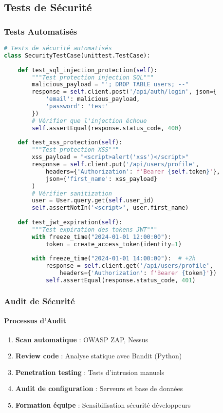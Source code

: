 \subsection{Tests de Sécurité}

\subsubsection{Tests Automatisés}

\begin{lstlisting}[language=python]
# Tests de sécurité automatisés
class SecurityTestCase(unittest.TestCase):
    
    def test_sql_injection_protection(self):
        """Test protection injection SQL"""
        malicious_payload = "'; DROP TABLE users; --"
        response = self.client.post('/api/auth/login', json={
            'email': malicious_payload,
            'password': 'test'
        })
        # Vérifier que l'injection échoue
        self.assertEqual(response.status_code, 400)
    
    def test_xss_protection(self):
        """Test protection XSS"""
        xss_payload = "<script>alert('xss')</script>"
        response = self.client.put('/api/users/profile', 
            headers={'Authorization': f'Bearer {self.token}'},
            json={'first_name': xss_payload}
        )
        # Vérifier sanitization
        user = User.query.get(self.user_id)
        self.assertNotIn('<script>', user.first_name)
    
    def test_jwt_expiration(self):
        """Test expiration des tokens JWT"""
        with freeze_time("2024-01-01 12:00:00"):
            token = create_access_token(identity=1)
        
        with freeze_time("2024-01-01 14:00:00"):  # +2h
            response = self.client.get('/api/users/profile',
                headers={'Authorization': f'Bearer {token}'})
            self.assertEqual(response.status_code, 401)
\end{lstlisting}

\subsubsection{Audit de Sécurité}

\paragraph{Processus d'Audit}
\begin{enumerate}
    \item \textbf{Scan automatique} : OWASP ZAP, Nessus
    \item \textbf{Review code} : Analyse statique avec Bandit (Python)
    \item \textbf{Penetration testing} : Tests d'intrusion manuels
    \item \textbf{Audit de configuration} : Serveurs et base de données
    \item \textbf{Formation équipe} : Sensibilisation sécurité développeurs
\end{enumerate}


